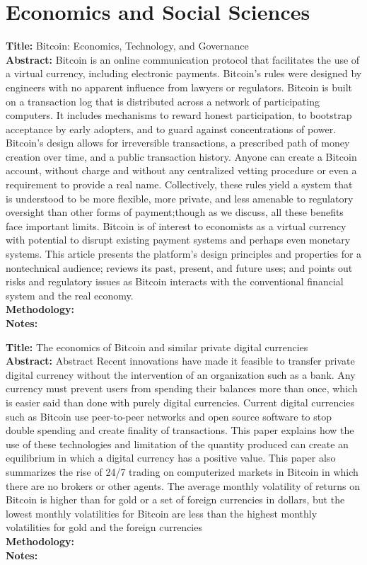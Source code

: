 \documentclass[a4paper, 12pt]{scrartcl}
\begin{document}
\section{Economics and Social Sciences}

\textbf{Title:} Bitcoin: Economics, Technology, and Governance \parencite{bohme2015} \\
\textbf{Abstract:} Bitcoin is an online communication protocol that facilitates the use of a virtual currency, including electronic payments. Bitcoin's rules were designed by engineers with no apparent influence from lawyers or regulators. Bitcoin is built on a transaction log that is distributed across
a network of participating computers. It includes mechanisms to reward honest participation, to bootstrap acceptance by early adopters, and to guard against concentrations of power. Bitcoin's design allows for irreversible transactions, a prescribed path of money creation over time, and a
public transaction history. Anyone can create a Bitcoin account, without charge and without any centralized vetting procedure or even a requirement to provide a real name. Collectively, these rules yield a system that is understood to be more flexible, more private, and less amenable
to regulatory oversight than other forms of payment;though as we discuss, all these benefits face important limits. Bitcoin is of interest to economists as a virtual currency with potential to disrupt existing payment systems and perhaps even monetary systems. This article presents the
platform's design principles and properties for a nontechnical audience; reviews its past, present, and future uses; and points out risks and regulatory issues as Bitcoin interacts with the conventional financial system and the real economy. \\
\textbf{Methodology:} \\
\textbf{Notes:}

\textbf{Title:} The economics of Bitcoin and similar private digital currencies \parencite{Dwyer201581} \\
\textbf{Abstract:} Abstract Recent innovations have made it feasible to transfer private digital currency without the intervention of an organization such as a bank. Any currency must prevent users from spending their balances more than once, which is easier said than done with purely digital currencies. Current digital currencies such as Bitcoin use peer-to-peer networks and open source software to stop double spending and create finality of transactions. This paper explains how the use of these technologies and limitation of the quantity produced can create an equilibrium in which a digital currency has a positive value. This paper also summarizes the rise of 24/7 trading on computerized markets in Bitcoin in which there are no brokers or other agents. The average monthly volatility of returns on Bitcoin is higher than for gold or a set of foreign currencies in dollars, but the lowest monthly volatilities for Bitcoin are less than the highest monthly volatilities for gold and the foreign currencies \\
\textbf{Methodology:} \\
\textbf{Notes:}
\end{document}
